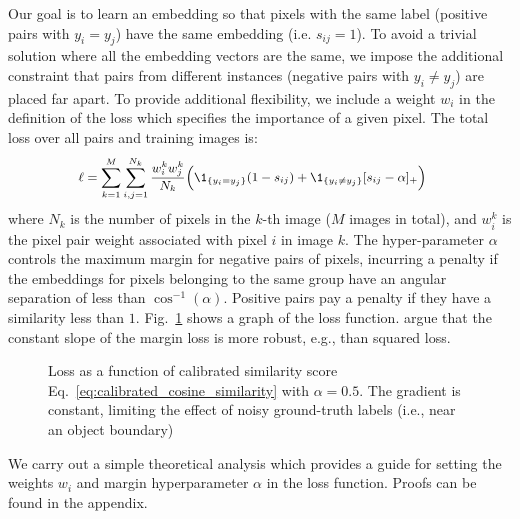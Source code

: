 Our goal is to learn an embedding so that pixels with the same label (positive
pairs with $y_i = y_j$) have the same embedding (i.e. $s_{ij}=1$). To avoid a
trivial solution where all the embedding vectors are the same, we impose the
additional constraint that pairs from different instances (negative pairs with
$y_i \neq y_j$) are placed far apart. To provide additional flexibility, we
include a weight $w_i$ in the definition of the loss which specifies the
importance of a given pixel. The total loss over all pairs and training images
is:
\begin{equation}
\small
\begin{split}
\ell = \sum_{k=1}^M  \sum_{i,j=1}^{N_k} \frac{w^k_i w^k_j}{N_k} \Big( \1_{\{y_i=y_j\}}(1-s_{ij})
 &+ \1_{\{y_i\not=y_j\}} [s_{ij}-\alpha]_{+} \Big)
\end{split}
\label{eq:obj}
\end{equation}
where $N_k$ is the number of pixels in the $k$-th image ($M$ images in
total), and $w^k_i$ is the pixel pair weight associated with pixel
$i$ in image $k$.  The hyper-parameter $\alpha$ controls the maximum margin
for negative pairs of pixels, incurring a penalty if the embeddings for pixels
belonging to the same group have an angular separation of less than
$\cos^{-1}(\alpha)$.  Positive pairs pay a penalty if they have a similarity
less than $1$.  Fig.~\ref{fig:lossFunc} shows a graph of the loss function.
\cite{wu2017sampling} argue that the constant slope of the margin loss is more
robust, e.g., than squared loss.

\begin{figure}[t]
\vspace{-1mm}
\hfill%
\begin{minipage}[t]{0.23\textwidth} %
\caption{\small
Loss as a function of calibrated similarity score Eq.~\ref{eq:calibrated_cosine_similarity}
with $\alpha=0.5$. The
gradient is constant, limiting the effect of noisy ground-truth labels
 (i.e., near an object boundary)}
\label{fig:lossFunc}
\end{minipage}
\vspace{-4mm}
\end{figure}

We carry out a simple theoretical analysis which provides a guide for setting
the weights $w_i$ and margin hyperparameter $\alpha$ in the loss function. Proofs
can be found in the appendix.

